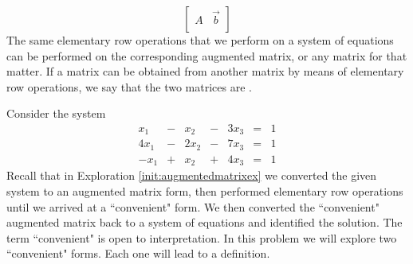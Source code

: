 \documentclass{ximera}
\begin{document}
$$\left[\begin{array}{c|c}  
 A & \vec{b}\\
 \end{array}\right]$$
The same elementary row operations that we perform on a system of equations can be performed on the corresponding augmented matrix, or any matrix for that matter.  If a matrix can be obtained from another matrix by means of elementary row operations, we say that the two matrices are .  
\begin{exploration}\label{init:backsub}
Consider the system
$$\begin{array}{ccccccc}
      x_1 &- &x_2&-&3x_3&= &1 \\
   4x_1& -&2x_2&-&7x_3&=&1\\
   -x_1& +&x_2&+&4x_3&=&1
    \end{array}$$
Recall that in Exploration \ref{init:augmentedmatrixex} we converted the given system to an augmented matrix form, then performed elementary row operations until we arrived at a ``convenient" form.  We then converted the ``convenient" augmented matrix back to a system of equations and identified the solution.  The term ``convenient" is open to interpretation.  In this problem we will explore two ``convenient" forms.  Each one will lead to a definition.  


\end{exploration}
\end{document}
